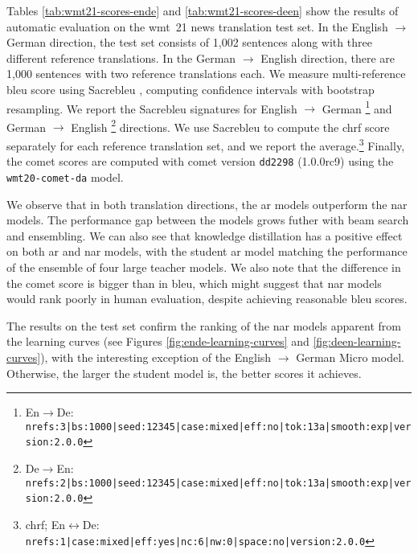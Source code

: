 Tables \ref{tab:wmt21-scores-ende} and \ref{tab:wmt21-scores-deen} show the
results of automatic evaluation
on the \acs{wmt}~21 news translation test set. In the English
$\rightarrow$ German direction, the test set consists of 1,002 sentences along
with three different reference translations. In the German $\rightarrow$
English direction, there are 1,000 sentences with two reference translations
each. We measure multi-reference \acs{bleu} score using Sacrebleu
\citep{post-2018-call}, computing confidence intervals with bootstrap
resampling. We report the Sacrebleu signatures for English $\rightarrow$
German%
\footnote{En$\rightarrow$De: {\scriptsize
    \texttt{nrefs:3|bs:1000|seed:12345|case:mixed|eff:no|tok:13a|smooth:exp|version:2.0.0}}}
and German $\rightarrow$ English%
\footnote{De$\rightarrow$En: {\scriptsize
    \texttt{nrefs:2|bs:1000|seed:12345|case:mixed|eff:no|tok:13a|smooth:exp|version:2.0.0}}}
directions. We use Sacrebleu to compute the \acs{chrf} score separately for
each reference translation set, and we report the average.\footnote{\acs{chrf};
  En$\leftrightarrow$De: {\scriptsize
    \texttt{nrefs:1|case:mixed|eff:yes|nc:6|nw:0|space:no|version:2.0.0}}}
Finally, the \acs{comet} scores are computed with \acs{comet} version
\texttt{dd2298} (1.0.0rc9) using the \texttt{wmt20-comet-da} model.

We observe that in both translation directions, the \ac{ar} models outperform
the \ac{nar} models. The performance gap between the models grows futher with
beam search and ensembling. We can also see that knowledge distillation has a
positive effect on both \ac{ar} and \ac{nar} models, with the student \ac{ar}
model matching the performance of the ensemble of four large teacher models.
We also note that the difference in the \acs{comet} score is bigger than in
\acs{bleu}, which might suggest that \acs{nar} models would rank poorly in
human evaluation, despite achieving reasonable \acs{bleu} scores.


The results on the test set confirm the ranking of the \acs{nar} models
apparent from the learning curves (see Figures \ref{fig:ende-learning-curves}
and \ref{fig:deen-learning-curves}), with the interesting exception of the
English $\rightarrow$ German Micro model. Otherwise, the larger the student
model is, the better scores it achieves.

